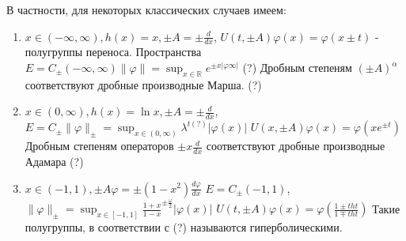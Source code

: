 \documentclass{article}
\begin{document}
В частности, для некоторых классических случаев имеем:
\begin{enumerate}
    \item $x \in (-\infty, \infty), h(x) = x, \pm A = \pm\frac{d}{dx}$,
    $U(t, \pm A)\varphi(x) = \varphi(x \pm t)$ - полугруппы переноса.
    Пространства
    $E = C_{\pm}(-\infty, \infty) \|\varphi\| = \sup_{x \in \mathbb{R}} e^{\pm x |\varphi \infty|}$ (?)
    Дробным степеням $(\pm A)^{\alpha}$ соответствуют дробные производные Марша. (?)
    \item $x \in (0, \infty), h(x) = \ln{x}, \pm A = \pm\frac{d}{dx}$,
    $E = C_{\pm} \|\varphi\|_{\pm} = \sup_{x \in (0, \infty)} \lambda^{t (?)} |\varphi(x)|$
    $U(x, \pm A)\varphi(x) = \varphi(x e^{\pm t})$
    Дробным степеням операторов $\pm x \frac{d}{dx}$ соответствуют дробные производные Адамара (?)
    \item $x \in (-1, 1), \pm A \varphi = \pm (1-x^2) \frac{d\varphi}{dx}$
    $E = C_{\pm}(-1, 1)$, $\|\varphi\|_{\pm} = \sup_{x \in [-1, 1]} \frac{1+x}{1-x}^{\pm \frac{\omega}{2}} |\varphi(x)|$
    $U(t, \pm A) \varphi(x) = \varphi(\frac{1 \pm tht}{1 \mp tht})$
    Такие полугруппы, в соответствии с (?) называются гиперболическими.
\end{enumerate}
\end{document}
